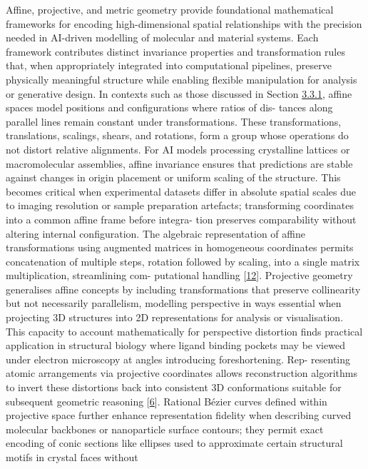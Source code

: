 \documentclass[
]{article}
\begin{document}
Affine, projective, and metric geometry provide foundational
mathematical frameworks for encoding high-dimensional spatial
relationships with the precision needed in AI-driven modelling of
molecular and material systems. Each framework contributes distinct
invariance properties and transformation rules that, when appropriately
integrated into computational pipelines, preserve physically meaningful
structure while enabling flexible manipulation for analysis or
generative design. In contexts such as those discussed in Section
\hyperref[combining-geometric-and-vector-representations]{3.3.1}, affine
spaces model positions and configurations where ratios of dis- tances
along parallel lines remain constant under transformations. These
transformations, translations, scalings, shears, and rotations, form a
group whose operations do not distort relative alignments. For AI models
processing crystalline lattices or macromolecular assemblies, affine
invariance ensures that predictions are stable against changes in origin
placement or uniform scaling of the structure. This becomes critical
when experimental datasets differ in absolute spatial scales due to
imaging resolution or sample preparation artefacts; transforming
coordinates into a common affine frame before integra- tion preserves
comparability without altering internal configuration. The algebraic
representation of affine transformations using augmented matrices in
homogeneous coordinates permits concatenation of multiple steps,
rotation followed by scaling, into a single matrix multiplication,
streamlining com- putational handling {[}\hyperref[_bookmark52]{12}{]}.
Projective geometry generalises affine concepts by including
transformations that preserve collinearity but not necessarily
parallelism, modelling perspective in ways essential when projecting 3D
structures into 2D representations for analysis or visualisation. This
capacity to account mathematically for perspective distortion finds
practical application in structural biology where ligand binding pockets
may be viewed under electron microscopy at angles introducing
foreshortening. Rep- resenting atomic arrangements via projective
coordinates allows reconstruction algorithms to invert these distortions
back into consistent 3D conformations suitable for subsequent geometric
reasoning {[}\hyperref[_bookmark46]{6}{]}. Rational Bézier curves
defined within projective space further enhance representation fidelity
when describing curved molecular backbones or nanoparticle surface
contours; they permit exact encoding of conic sections like ellipses
used to approximate certain structural motifs in crystal faces without
\end{document}

